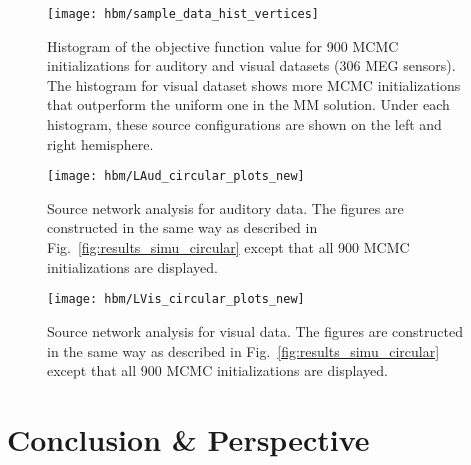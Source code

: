 \begin{figure}[htp]
	\centering
	\texttt{[image: hbm/sample\_data\_hist\_vertices]}%
	\caption{Histogram of the objective function value for 900 MCMC initializations for auditory and visual datasets (306 MEG sensors). The histogram for visual dataset shows more MCMC initializations that outperform the uniform one in the MM solution. Under each histogram, these source configurations are shown on the left and right hemisphere.
	}
	\label{fig:hist_real_datasets}
\end{figure}



\begin{figure}[htp]
	\centering
	\texttt{[image: hbm/LAud\_circular\_plots\_new]}%
	\caption{Source network analysis for auditory data. The figures are constructed in the same way as described in Fig.~\ref{fig:results_simu_circular} except that all 900 MCMC initializations are displayed.}
	\label{fig:circular_plots_LAud}
\end{figure}



\begin{figure}[htp]
	\centering
	\texttt{[image: hbm/LVis\_circular\_plots\_new]}%
	\caption{Source network analysis for visual data. The figures are constructed in the same way as described in Fig.~\ref{fig:results_simu_circular} except that all 900 MCMC initializations are displayed.}
	\label{fig:circular_plots_LVis}
\end{figure}

\section{Conclusion \& Perspective}
\label{sec:Dis}

